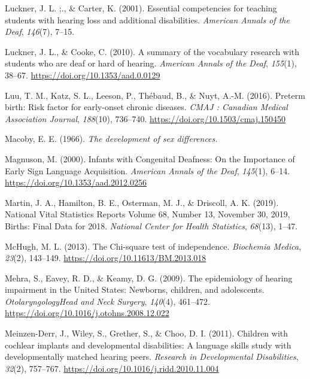 \documentclass[english,man]{apa6}
\begin{document}
\leavevmode\hypertarget{ref-luckner2001}{}%
Luckner, J. L. ;., \& Carter, K. (2001). Essential competencies for teaching students with hearing loss and additional disabilities. \emph{American Annals of the Deaf}, \emph{146}(7), 7--15.

\leavevmode\hypertarget{ref-luckner2010}{}%
Luckner, J. L., \& Cooke, C. (2010). A summary of the vocabulary research with students who are deaf or hard of hearing. \emph{American Annals of the Deaf}, \emph{155}(1), 38--67. \url{https://doi.org/10.1353/aad.0.0129}

\leavevmode\hypertarget{ref-luu2016}{}%
Luu, T. M., Katz, S. L., Leeson, P., Thébaud, B., \& Nuyt, A.-M. (2016). Preterm birth: Risk factor for early-onset chronic diseases. \emph{CMAJ : Canadian Medical Association Journal}, \emph{188}(10), 736--740. \url{https://doi.org/10.1503/cmaj.150450}

\leavevmode\hypertarget{ref-macoby1966}{}%
Macoby, E. E. (1966). \emph{The development of sex differences.}

\leavevmode\hypertarget{ref-magnuson2000}{}%
Magnuson, M. (2000). Infants with Congenital Deafness: On the Importance of Early Sign Language Acquisition. \emph{American Annals of the Deaf}, \emph{145}(1), 6--14. \url{https://doi.org/10.1353/aad.2012.0256}

\leavevmode\hypertarget{ref-martin2019}{}%
Martin, J. A., Hamilton, B. E., Osterman, M. J., \& Driscoll, A. K. (2019). National Vital Statistics Reports Volume 68, Number 13, November 30, 2019, Births: Final Data for 2018. \emph{National Center for Health Statistics}, \emph{68}(13), 1--47.

\leavevmode\hypertarget{ref-mchugh2013}{}%
McHugh, M. L. (2013). The Chi-square test of independence. \emph{Biochemia Medica}, \emph{23}(2), 143--149. \url{https://doi.org/10.11613/BM.2013.018}

\leavevmode\hypertarget{ref-mehra2009}{}%
Mehra, S., Eavey, R. D., \& Keamy, D. G. (2009). The epidemiology of hearing impairment in the United States: Newborns, children, and adolescents. \emph{OtolaryngologyHead and Neck Surgery}, \emph{140}(4), 461--472. \url{https://doi.org/10.1016/j.otohns.2008.12.022}

\leavevmode\hypertarget{ref-meinzen-derr2011}{}%
Meinzen-Derr, J., Wiley, S., Grether, S., \& Choo, D. I. (2011). Children with cochlear implants and developmental disabilities: A language skills study with developmentally matched hearing peers. \emph{Research in Developmental Disabilities}, \emph{32}(2), 757--767. \url{https://doi.org/10.1016/j.ridd.2010.11.004}
\end{document}
